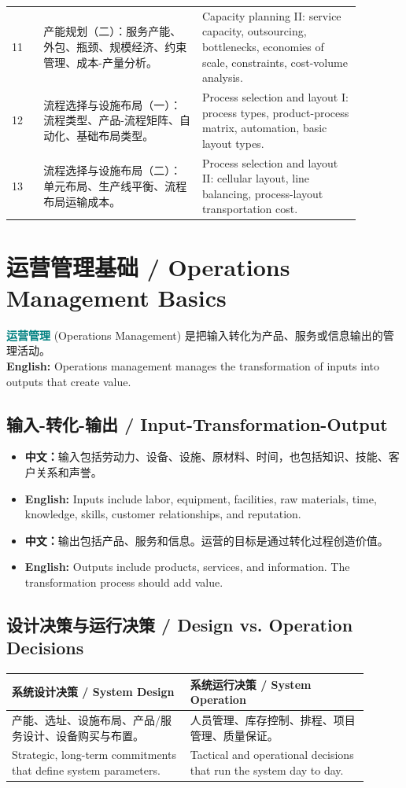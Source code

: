 \documentclass[11pt,a4paper]{ctexart}
\newcommand{\term}[2]{\textbf{\textcolor{Teal}{#1}} \textcolor{Muted}{(#2)}}
\newcommand{\cn}[1]{\textbf{中文：}#1}
\newcommand{\en}[1]{\textbf{English:} #1}
\begin{document}
\begin{longtable}{@{}L{0.08\linewidth}L{0.40\linewidth}L{0.40\linewidth}@{}}
11 & 产能规划（二）：服务产能、外包、瓶颈、规模经济、约束管理、成本-产量分析。 & Capacity planning II: service capacity, outsourcing, bottlenecks, economies of scale, constraints, cost-volume analysis. \\
12 & 流程选择与设施布局（一）：流程类型、产品-流程矩阵、自动化、基础布局类型。 & Process selection and layout I: process types, product-process matrix, automation, basic layout types. \\
13 & 流程选择与设施布局（二）：单元布局、生产线平衡、流程布局运输成本。 & Process selection and layout II: cellular layout, line balancing, process-layout transportation cost. \\
\bottomrule
\end{longtable}

\section{运营管理基础 / Operations Management Basics}

\term{运营管理}{Operations Management} 是把输入转化为产品、服务或信息输出的管理活动。\\
\en{Operations management manages the transformation of inputs into outputs that create value.}

\subsection{输入-转化-输出 / Input-Transformation-Output}
\begin{itemize}
  \item \cn{输入包括劳动力、设备、设施、原材料、时间，也包括知识、技能、客户关系和声誉。}
  \item \en{Inputs include labor, equipment, facilities, raw materials, time, knowledge, skills, customer relationships, and reputation.}
  \item \cn{输出包括产品、服务和信息。运营的目标是通过转化过程创造价值。}
  \item \en{Outputs include products, services, and information. The transformation process should add value.}
\end{itemize}

\subsection{设计决策与运行决策 / Design vs. Operation Decisions}
\begin{longtable}{L{0.45\linewidth}L{0.45\linewidth}}
\toprule
\textbf{系统设计决策 / System Design} & \textbf{系统运行决策 / System Operation} \\
\midrule
产能、选址、设施布局、产品/服务设计、设备购买与布置。 & 人员管理、库存控制、排程、项目管理、质量保证。 \\
Strategic, long-term commitments that define system parameters. & Tactical and operational decisions that run the system day to day. \\
\bottomrule
\end{longtable}
\end{document}
